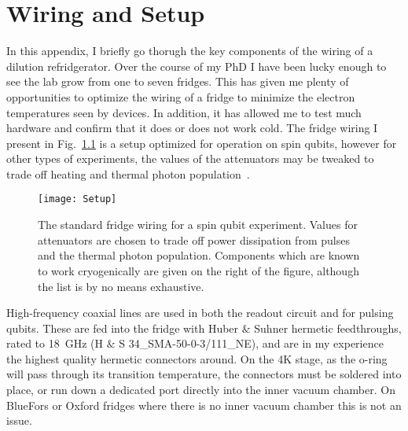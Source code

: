 \chapter{Wiring and Setup}
\label{sec:setup}

In this appendix, I briefly go thorugh the key components of the wiring of a dilution refridgerator. Over the
course of my PhD I have been lucky enough to see the lab grow from one to seven fridges. This has given me
plenty of opportunities to optimize the wiring of a fridge to minimize the electron temperatures seen by
devices. In addition, it has allowed me to test much hardware and confirm that it does or does not work
cold. The fridge wiring I present in Fig.~\ref{fig:wiring} is a setup optimized for operation on spin qubits, however
for other types of experiments, the values of the attenuators may be tweaked to trade off heating and thermal
photon population~\cite{Krinner2019}.

\begin{figure}
    \texttt{[image: Setup]}
    \caption[Standard wiring diagram for a dilution refridgerator]
    {\label{fig:wiring}The standard fridge wiring for a spin qubit experiment. Values for attenuators are chosen
    to trade off power dissipation from pulses and the thermal photon population. Components which are known to
    work cryogenically are given on the right of the figure, although the list is by no means exhaustive.}
\end{figure}

High-frequency coaxial lines are used in both the readout circuit and for pulsing qubits. These are fed into
the fridge with Huber $\&$ Suhner hermetic feedthroughs, rated to \SI{18}{\giga\hertz} (H $\&$ S 34\_SMA-50-0-3/111\_NE),
and are in my experience the highest quality hermetic connectors around. On the 4K stage, as the o-ring will pass
through its transition temperature, the connectors must be soldered into place, or run down a dedicated port
directly into the inner vacuum chamber. On BlueFors or Oxford fridges where there is no inner vacuum chamber
this is not an issue.

